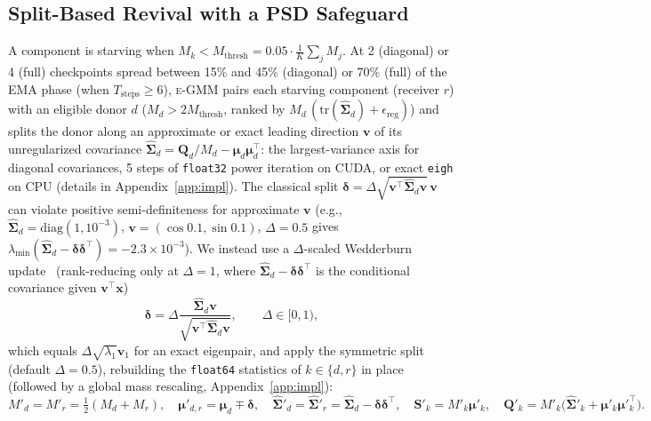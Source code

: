 \documentclass[10pt]{article} %
\newcommand{\egmm}{\textsc{e-GMM}}
\newcommand{\tr}{\mathrm{tr}}
\newcommand{\diag}{\mathrm{diag}}
\begin{document}
\subsection{Split-Based Revival with a PSD Safeguard}
\label{sec:revival}

A component is starving when $M_k < M_{\mathrm{thresh}} = 0.05 \cdot \frac{1}{K}\sum_{j} M_j$. At 2 (diagonal) or 4 (full) checkpoints spread between 15\% and 45\% (diagonal) or 70\% (full) of the EMA phase (when $T_{\mathrm{steps}} \ge 6$), \egmm{} pairs each starving component (receiver $r$) with an eligible donor $d$ ($M_d > 2 M_{\mathrm{thresh}}$, ranked by $M_d\,(\tr(\hat{\boldsymbol{\Sigma}}_d) + \epsilon_{\mathrm{reg}})$) and splits the donor along an approximate or exact leading direction $\mathbf{v}$ of its unregularized covariance $\hat{\boldsymbol{\Sigma}}_d = \mathbf{Q}_d / M_d - \boldsymbol{\mu}_d \boldsymbol{\mu}_d^\top$: the largest-variance axis for diagonal covariances, 5 steps of \texttt{float32} power iteration on CUDA, or exact \texttt{eigh} on CPU (details in Appendix~\ref{app:impl}). The classical split $\boldsymbol{\delta} = \Delta\sqrt{\mathbf{v}^\top \hat{\boldsymbol{\Sigma}}_d \mathbf{v}}\,\mathbf{v}$~\citep{zhang2003em} can violate positive semi-definiteness for approximate $\mathbf{v}$ (e.g., $\hat{\boldsymbol{\Sigma}}_d = \diag(1, 10^{-3})$, $\mathbf{v} = (\cos 0.1, \sin 0.1)$, $\Delta = 0.5$ gives $\lambda_{\min}(\hat{\boldsymbol{\Sigma}}_d - \boldsymbol{\delta}\boldsymbol{\delta}^\top) = -2.3 \times 10^{-3}$). We instead use a $\Delta$-scaled Wedderburn update~\citep{chu1995rank} (rank-reducing only at $\Delta = 1$, where $\hat{\boldsymbol{\Sigma}}_d - \boldsymbol{\delta}\boldsymbol{\delta}^\top$ is the conditional covariance given $\mathbf{v}^\top\mathbf{x}$)
\begin{equation}
\boldsymbol{\delta} = \Delta \frac{\hat{\boldsymbol{\Sigma}}_d \mathbf{v}}{\sqrt{\mathbf{v}^\top \hat{\boldsymbol{\Sigma}}_d \mathbf{v}}}, \qquad \Delta \in [0, 1),
\label{eq:wedderburn_delta}
\end{equation}
which equals $\Delta\sqrt{\lambda_1}\mathbf{v}_1$ for an exact eigenpair, and apply the symmetric split (default $\Delta = 0.5$), rebuilding the \texttt{float64} statistics of $k \in \{d, r\}$ in place (followed by a global mass rescaling, Appendix~\ref{app:impl}):
\begin{equation}
M'_d = M'_r = \tfrac{1}{2}(M_d + M_r), \quad
\boldsymbol{\mu}'_{d,r} = \boldsymbol{\mu}_d \mp \boldsymbol{\delta}, \quad
\hat{\boldsymbol{\Sigma}}'_d = \hat{\boldsymbol{\Sigma}}'_r = \hat{\boldsymbol{\Sigma}}_d - \boldsymbol{\delta}\boldsymbol{\delta}^\top, \quad
\mathbf{S}'_k = M'_k \boldsymbol{\mu}'_k, \quad
\mathbf{Q}'_k = M'_k\bigl(\hat{\boldsymbol{\Sigma}}'_k + \boldsymbol{\mu}'_k \boldsymbol{\mu}'^\top_k\bigr).
\label{eq:rev_cov}
\end{equation}
\end{document}
